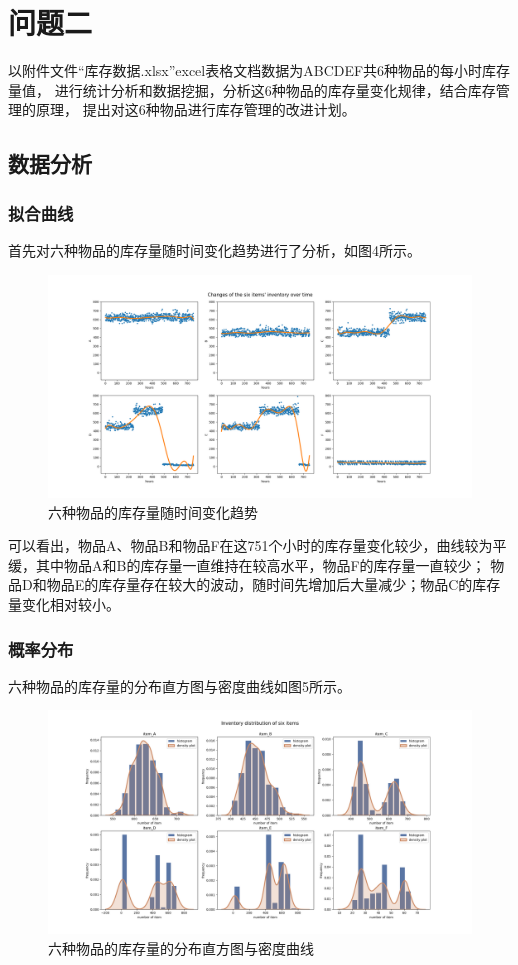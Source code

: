 \documentclass[12pt,a4paper]{article}
\begin{document}
\clearpage
\section{问题二}
以附件文件“库存数据.xlsx”excel表格文档数据为ABCDEF共6种物品的每小时库存量值，
进行统计分析和数据挖掘，分析这6种物品的库存量变化规律，结合库存管理的原理，
提出对这6种物品进行库存管理的改进计划。
\subsection{数据分析}
\subsubsection{拟合曲线}
首先对六种物品的库存量随时间变化趋势进行了分析，如图4所示。
\begin{figure}[h]
    \centering
    \includegraphics[scale=0.4]{fig4.png}
    \caption{六种物品的库存量随时间变化趋势}
    \label{fig:4}
\end{figure}

可以看出，物品A、物品B和物品F在这751个小时的库存量变化较少，曲线较为平缓，其中物品A和B的库存量一直维持在较高水平，物品F的库存量一直较少；
物品D和物品E的库存量存在较大的波动，随时间先增加后大量减少；物品C的库存量变化相对较小。

\subsubsection{概率分布}
六种物品的库存量的分布直方图与密度曲线如图5所示。
\begin{figure}[h]
    \centering
    \includegraphics[scale=0.4]{fig5.png}
    \caption{六种物品的库存量的分布直方图与密度曲线}
    \label{fig:5}
\end{figure}
\end{document}

